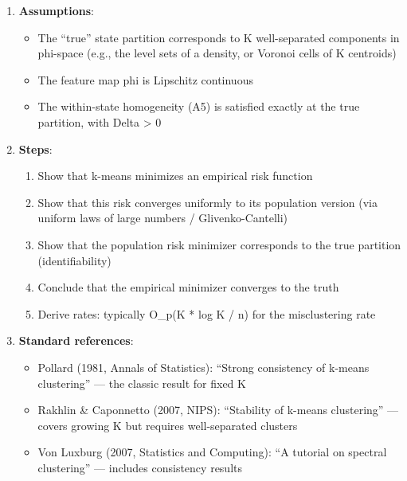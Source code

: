 \documentclass[
  12pt,
]{article}
\providecommand{\tightlist}{%
  \setlength{\itemsep}{0pt}\setlength{\parskip}{0pt}}
\begin{document}
\begin{enumerate}
\def\labelenumi{\arabic{enumi}.}
\tightlist
\item
  \textbf{Assumptions}:

  \begin{itemize}
  \tightlist
  \item
    The ``true'' state partition corresponds to K well-separated
    components in phi-space (e.g., the level sets of a density, or
    Voronoi cells of K centroids)
  \item
    The feature map phi is Lipschitz continuous
  \item
    The within-state homogeneity (A5) is satisfied exactly at the true
    partition, with Delta \textgreater{} 0
  \end{itemize}
\item
  \textbf{Steps}:

  \begin{enumerate}
  \def\labelenumii{\alph{enumii}.}
  \tightlist
  \item
    Show that k-means minimizes an empirical risk function
  \item
    Show that this risk converges uniformly to its population version
    (via uniform laws of large numbers / Glivenko-Cantelli)
  \item
    Show that the population risk minimizer corresponds to the true
    partition (identifiability)
  \item
    Conclude that the empirical minimizer converges to the truth
  \item
    Derive rates: typically O\_p(K * log K / n) for the misclustering
    rate
  \end{enumerate}
\item
  \textbf{Standard references}:

  \begin{itemize}
  \tightlist
  \item
    Pollard (1981, Annals of Statistics): ``Strong consistency of
    k-means clustering'' --- the classic result for fixed K
  \item
    Rakhlin \& Caponnetto (2007, NIPS): ``Stability of k-means
    clustering'' --- covers growing K but requires well-separated
    clusters
  \item
    Von Luxburg (2007, Statistics and Computing): ``A tutorial on
    spectral clustering'' --- includes consistency results
  \end{itemize}
\end{enumerate}
\end{document}

